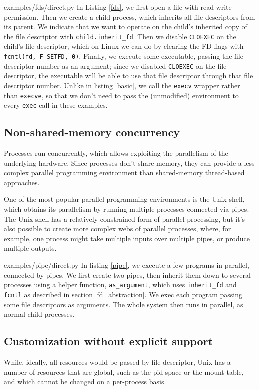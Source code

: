\documentclass[letterpaper,twocolumn,10pt]{article}
\begin{document}

{examples/fds/direct.py}
In Listing \ref{fds},
we first open a file with read-write permission.
Then we create a child process,
which inherits all file descriptors from its parent.
We indicate that we want to operate on the child's inherited copy of the file descriptor with \verb|child.inherit_fd|.
Then we disable \texttt{CLOEXEC} on the child's file descriptor,
which on Linux we can do by clearing the FD flags with \verb|fcntl(fd, F_SETFD, 0)|.
Finally, we execute some executable,
passing the file descriptor number as an argument;
since we disabled \texttt{CLOEXEC} on the file descriptor,
the executable will be able to use that file descriptor through that file descriptor number.
Unlike in listing \ref{basic}, we call the \texttt{execv} wrapper rather than \texttt{execve},
so that we don't need to pass the (unmodified) environment to every \texttt{exec} call in these examples.
\subsection{Non-shared-memory concurrency}
Processes run concurrently,
which allows exploiting the parallelism of the underlying hardware.
Since processes don't share memory,
they can provide a less complex parallel programming environment
than shared-memory thread-based approaches.

One of the most popular parallel programming environments is the Unix shell,
which obtains its parallelism by running multiple processes connected via pipes.
The Unix shell has a relatively constrained form of parallel processing,
but it's also possible to create more complex webs of parallel processes,
where, for example, one process might take multiple inputs over multiple pipes,
or produce multiple outputs.


{examples/pipe/direct.py}
In listing \ref{pipe},
we execute a few programs in parallel,
connected by pipes.
We first create two pipes,
then inherit them down to several processes using a helper function, \verb|as_argument|,
which uses \verb|inherit_fd| and \texttt{fcntl} as described in section \ref{fd_abstraction}.
We exec each program passing some file descriptors as arguments.
The whole system then runs in parallel,
as normal child processes.
\subsection{Customization without explicit support}
While, ideally, all resources would be passed by file descriptor\cite{capsicum},
Unix has a number of resources that are global,
such as the pid space or the mount table,
and which cannot be changed on a per-process basis.
\end{document}
